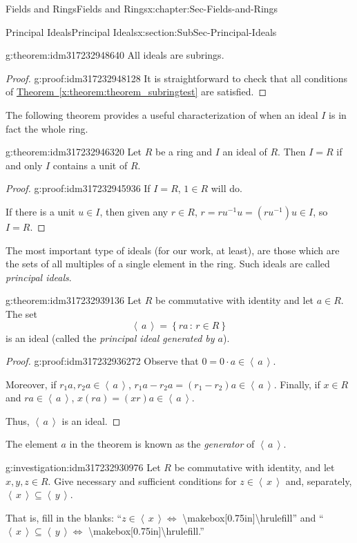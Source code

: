 \documentclass[oneside,10pt,]{book}
\newcommand{\xreffont}{\relax}
\numberwithin{equation}{section}
\newcommand{\ideal}[1]{\left\langle\, #1 \,\right\rangle}
\newcommand{\setof}[2]{{\left\{#1\,\colon\,#2\right\}}}
\begin{document}
\begin{chapterptx}{Fields and Rings}{}{Fields and Rings}{}{}{x:chapter:Sec-Fields-and-Rings}
\begin{sectionptx}{Principal Ideals}{}{Principal Ideals}{}{}{x:section:SubSec-Principal-Ideals}
\begin{theorem}{}{}{g:theorem:idm317232948640}
All ideals are subrings.%
\end{theorem}
\begin{proof}{}{g:proof:idm317232948128}
It is straightforward to check that all conditions of \hyperref[x:theorem:theorem_subringtest]{Theorem~{\xreffont\ref{x:theorem:theorem_subringtest}}} are satisfied.%
\end{proof}
The following theorem provides a useful characterization of when an ideal \(I\) is in fact the whole ring.%
\begin{theorem}{}{}{g:theorem:idm317232946320}%
Let \(R\) be a ring and \(I\) an ideal of \(R\). Then \(I = R\) if and only \(I\) contains a unit of \(R\).%
\end{theorem}
\begin{proof}{}{g:proof:idm317232945936}
If \(I = R\), \(1\in R\) will do.%
\par
If there is a unit \(u\in I\), then given any \(r\in R\), \(r = r u^{-1} u = (ru^{-1}) u \in I\), so \(I = R\).%
\end{proof}
The most important type of ideals (for our work, at least), are those which are the sets of all multiples of a single element in the ring. Such ideals are called \emph{principal ideals}.%
\begin{theorem}{}{}{g:theorem:idm317232939136}%
Let \(R\) be commutative with identity and let \(a\in R\). The set%
\begin{equation*}
\ideal{a} = \setof{ra}{r\in R}
\end{equation*}
is an ideal (called the \emph{principal ideal generated by \(a\)}).%
\end{theorem}
\begin{proof}{}{g:proof:idm317232936272}
Observe that \(0 = 0\cdot a \in \ideal{a}\).%
\par
Moreover, if \(r_1 a, r_2 a\in \ideal{a}\), \(r_1 a - r_2 a = (r_1 - r_2)a \in \ideal{a}\). Finally, if \(x\in R\) and \(r a\in \ideal{a}\), \(x (ra) = (xr) a \in \ideal{a}\).%
\par
Thus, \(\ideal{a}\) is an ideal.%
\end{proof}
The element \(a\) in the theorem is known as the \emph{generator} of \(\ideal{a}\).%
\begin{investigation}{}{g:investigation:idm317232930976}%
Let \(R\) be commutative with identity, and let \(x,y,z\in R\). Give necessary and sufficient conditions for \(z\in \ideal{x}\) and, separately, \(\ideal{x} \subseteq \ideal{y}\).%
\par
That is, fill in the blanks: ``\(z\in \ideal{x} \Leftrightarrow\) \textbackslash{}makebox[0.75in]\textbraceleft{}\textbackslash{}hrulefill\textbraceright{}'' and ``\(\ideal{x}\subseteq \ideal{y} \Leftrightarrow\) \textbackslash{}makebox[0.75in]\textbraceleft{}\textbackslash{}hrulefill\textbraceright{}.''%

\end{investigation}
\end{sectionptx}
\end{chapterptx}
\end{document}
